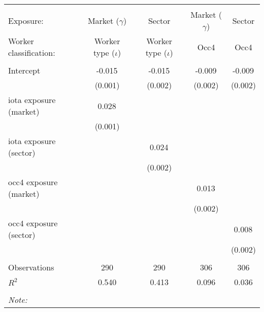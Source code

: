 \begin{tabular}{@{\extracolsep{5pt}}lcccc}
\\[-1.8ex]\hline
\hline \\[-1.8ex]
\hline \\[-1.8ex]
 Exposure: & Market ($\gamma$) & Sector & Market ($\gamma$) & Sector \\
 Worker classification: & Worker type ($\iota$) & Worker type ($\iota$) & Occ4 & Occ4 \\
 \hline &  &  &  &  \\
 Intercept & -0.015$^{}$ & -0.015$^{}$ & -0.009$^{}$ & -0.009$^{}$ \\
  & (0.001) & (0.002) & (0.002) & (0.002) \\
 iota exposure (market) & 0.028$^{}$ & & & \\
  & (0.001) & & & \\
 iota exposure (sector) & & 0.024$^{}$ & & \\
  & & (0.002) & & \\
 occ4 exposure (market) & & & 0.013$^{}$ & \\
  & & & (0.002) & \\
 occ4 exposure (sector) & & & & 0.008$^{}$ \\
  & & & & (0.002) \\
\hline \\[-1.8ex]
 Observations & 290 & 290 & 306 & 306 \\
 $R^2$ & 0.540 & 0.413 & 0.096 & 0.036 \\
\hline
\hline \\[-1.8ex]
\textit{Note:}\end{tabular}